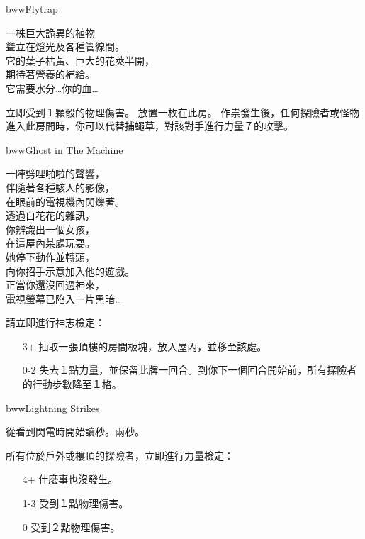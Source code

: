 \linebreak[0]%
\begin{EventCard}{bww}{Flytrap}
	\begin{CardStory}
		一株巨大詭異的植物\\
		聳立在燈光及各種管線間。\\
		它的葉子枯黃、巨大的花莢半開，\\
		期待著營養的補給。\\
		它需要水分…你的血…
	\end{CardStory}
	立即受到１顆骰的物理傷害。\smallbreak
	放置一枚在此房。\smallbreak
	作祟發生後，任何探險者或怪物進入此房間時，你可以代替捕蠅草，對該對手進行力量７的攻擊。\smallbreak
\end{EventCard}%
\linebreak[0]%
\begin{EventCard}{bww}{Ghost in The Machine}
	\begin{CardStory}
		一陣劈哩啪啦的聲響，\\
		伴隨著各種駭人的影像，\\
		在眼前的電視機內閃爍著。\\
		透過白花花的雜訊，\\
		你辨識出一個女孩，\\
		在這屋內某處玩耍。\\
		她停下動作並轉頭，\\
		向你招手示意加入他的遊戲。\\
		正當你還沒回過神來，\\
		電視螢幕已陷入一片黑暗…
	\end{CardStory}
	請立即進行神志檢定：
	\begin{itemize}
		\item[3+] 抽取一張頂樓的房間板塊，放入屋內，並移至該處。
		\item[0-2] 失去１點力量，並保留此牌一回合。到你下一個回合開始前，所有探險者的行動步數降至１格。
	\end{itemize}
\end{EventCard}%
\linebreak[0]%
\begin{EventCard}{bww}{Lightning Strikes}
	\begin{CardStory}
		從看到閃電時開始讀秒。兩秒。
	\end{CardStory}
	所有位於戶外或樓頂的探險者，立即進行力量檢定：
	\begin{itemize}
		\item[4+] 什麼事也沒發生。
		\item[1-3] 受到１點物理傷害。
		\item[0] 受到２點物理傷害。
	\end{itemize}
\end{EventCard}%
